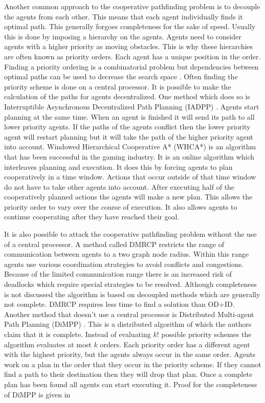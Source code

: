 Another common approach to the cooperative pathfinding problem is to decouple 
the agents from each other. This means that each agent individually finds it 
optimal path. This generally forgoes completeness for the sake of speed. 
Usually this is done by imposing a hierarchy on the agents. Agents need to 
consider agents with a higher priority as moving obstacles. This is why these 
hierarchies are often known as priority orders. Each agent has a unique 
position in the order. Finding a priority ordering is a combinatorial problem 
but dependencies between optimal paths can be used to decrease the search space 
\citep{bennewitz2002}. Often finding the priority scheme is done on a central 
processor. It is possible to make the calculation of the paths for agents 
decentralized. One method which does so is Interruptible Asynchronous 
Decentralized Path Planning (IADPP) \citep{cap2012}. Agents start planning at 
the same time. When an agent is finished it will send its path to all lower 
priority agents. If the paths of the agents conflict then the lower priority 
agent will restart planning but it will take the path of the higher priority 
agent into account. Windowed Hierarchical Cooperative A* (WHCA*) 
\citep{silver2005} is an algorithm that has been successful in the gaming 
industry. It is an online algorithm which interleaves planning and execution. 
It does this by forcing agents to plan cooperatively in a time window. Actions 
that occur outside of that time window do not have to take other agents into 
account. After executing half of the cooperatively planned actions the agents 
will make a new plan. This allows the priority order to vary over the course of 
execution. It also allows agents to continue cooperating after they have 
reached their goal.

It is also possible to attack the cooperative pathfinding problem without the 
use of a central processor. A method called DMRCP \citep{wei2016} restricts the 
range of communication between agents to a two graph node radius. Within this 
range agents use various coordination strategies to avoid conflicts and 
congestions. Because of the limited communication range there is an increased 
risk of deadlocks which require special strategies to be resolved. Although 
completeness is not discussed the algorithm is based on decoupled methods which 
are generally not complete. DMRCP requires less time to find a solution than 
OD+ID. Another method that doesn't use a central processor is Distributed 
Multi-agent Path Planning (DiMPP) \citep{chouhan2017}. This is a distributed 
algorithm of which the authors claim that it is complete. Instead of evaluating 
$k!$ possible priority schemes the algorithm evaluates at most $k$ orders. Each 
priority order has a different agent with the highest priority, but the agents 
always occur in the same order. Agents work on a plan in the order that they 
occur in the priority scheme. If they cannot find a path to their destination 
then they will drop that plan. Once a complete plan has been found all agents 
can start executing it. Proof for the completeness of DiMPP is given in 
\cite[subsection 5.1]{chouhan2017}

